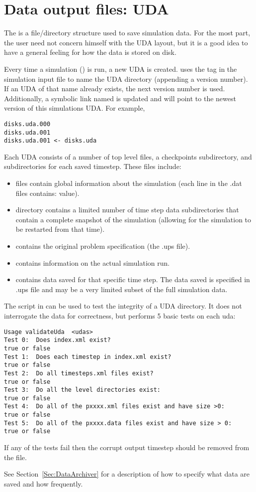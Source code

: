 \chapter{Data output files: UDA}
The  is a file/directory structure used to save \Vaango simulation
data.  For the most part, the user need not concern himself with the
UDA layout, but it is a good idea to have a general feeling for how
the data is stored on disk.

Every time a simulation () is run, a new UDA is created.  \Vaango uses
the  tag in the simulation input file to name the UDA
directory (appending a version number).  If an UDA of that name
already exists, the next version number is used.  Additionally, a
symbolic link named  is updated and will point to
the newest version of this simulations UDA.  For example,
\begin{lstlisting}[backgroundcolor=\color{background}]
disks.uda.000
disks.uda.001
disks.uda.001 <- disks.uda
\end{lstlisting}

Each UDA consists of a number of top level files, a checkpoints
subdirectory, and subdirectories for each saved timestep.  These files
include:
\begin{itemize}
\item {} files contain global information about the
  simulation (each line in the .dat files contains: 
  value).
\item {} directory contains a limited
  number of time step data subdirectories that contain a complete
  snapshot of the simulation (allowing for the simulation to be
  restarted from that time).
\item {} contains the original problem
  specification (the .ups file).
\item {} contains information on the actual
  simulation run.
\item {} contains data saved for that specific
  time step.  The data saved is specified in .ups file and may be a
  very limited subset of the full simulation data.

\end{itemize}

The  script in  can be used to
test the integrity of a UDA directory. It does not interrogate the data
for correctness, but performs 5 basic tests on each uda:
\begin{lstlisting}[backgroundcolor=\color{background}]
Usage validateUda  <udas>
Test 0:  Does index.xml exist?                                        true or false
Test 1:  Does each timestep in index.xml exist?                       true or false
Test 2:  Do all timesteps.xml files exist?                            true or false
Test 3:  Do all the level directories exist:                          true or false
Test 4:  Do all of the pxxxx.xml files exist and have size >0:        true or false
Test 5:  Do all of the pxxxx.data files exist and have size > 0:      true or false
\end{lstlisting}

If any of the tests fail then the corrupt output timestep should be removed from 
the  file.

See Section~\ref{Sec:DataArchiver} for a description of how to specify
what data are saved and how frequently.


